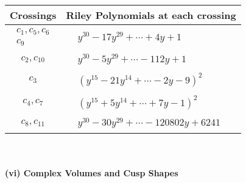 \documentclass[1p]{elsarticle_modified}
\theoremstyle{definition}
\begin{document}
\begin{tabular}{m{50pt}|m{274pt}}
Crossings & \hspace{64pt}Riley Polynomials at each crossing \\
\hline $$\begin{aligned}c_{1},c_{5},c_{6}\\c_{9}\end{aligned}$$&$\begin{aligned}
&y^{30}-17 y^{29}+\cdots+4 y+1
\end{aligned}$\\
\hline $$\begin{aligned}c_{2},c_{10}\end{aligned}$$&$\begin{aligned}
&y^{30}-5 y^{29}+\cdots-112 y+1
\end{aligned}$\\
\hline $$\begin{aligned}c_{3}\end{aligned}$$&$\begin{aligned}
&(y^{15}-21 y^{14}+\cdots-2 y-9)^{2}
\end{aligned}$\\
\hline $$\begin{aligned}c_{4},c_{7}\end{aligned}$$&$\begin{aligned}
&(y^{15}+5 y^{14}+\cdots+7 y-1)^{2}
\end{aligned}$\\
\hline $$\begin{aligned}c_{8},c_{11}\end{aligned}$$&$\begin{aligned}
&y^{30}-30 y^{29}+\cdots-120802 y+6241
\end{aligned}$\\
\hline
\end{tabular}\\~\\
\newpage\flushleft \textbf{(vi) Complex Volumes and Cusp Shapes}
\end{document}

